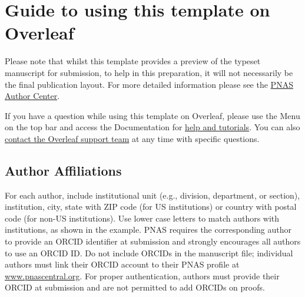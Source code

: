 \documentclass[9pt,twoside]{pnas-new}
\begin{document}



\section*{Guide to using this template on Overleaf}

Please note that whilst this template provides a preview of the typeset manuscript for submission, to help in this preparation, it will not necessarily be the final publication layout. For more detailed information please see the \href{https://www.pnas.org/author-center/submitting-your-manuscript}{PNAS Author Center}.

If you have a question while using this template on Overleaf, please use the  Menu on the top bar and access the Documentation for \href{https://www.overleaf.com/help}{help and tutorials}. You can also \href{https://www.overleaf.com/contact}{contact the Overleaf support team} at any time with specific questions.

\subsection*{Author Affiliations}

For each author, include institutional unit (e.g., division, department, or section), institution, city, state with ZIP code (for US institutions) or country with postal code (for non-US institutions). Use lower case letters to match authors with institutions, as shown in the example. PNAS requires the corresponding author to provide an ORCID identifier at submission and strongly encourages all authors to use an ORCID ID. Do not include ORCIDs in the manuscript file; individual authors must link their ORCID account to their PNAS profile at \href{http://www.pnascentral.org/}{www.pnascentral.org}. For proper authentication, authors must provide their ORCID at submission and are not permitted to add ORCIDs on proofs.
\end{document}
